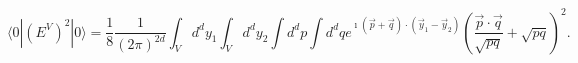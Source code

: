 \begin{equation}
\label{E:HV2}
    \langle 0|(E^V)^2|0\rangle = \frac{1}{8} \frac{1}{(2\pi)^{2d}}
               \int_V d^dy_1\int_V d^dy_2 \int d^dp \int d^dq
                e^{\imath(\vec{p}+\vec{q})\cdot
               (\vec{y}_1-\vec{y}_2)}
               {\left(\frac{\vec{p} \cdot \vec{q}}
                    {\sqrt{ p  q}} +
                    \sqrt{p q}\right)}^2.
\end{equation}

